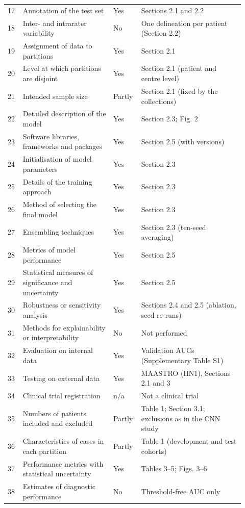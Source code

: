 \begin{longtable}{@{}L{0.06\linewidth}L{0.36\linewidth}L{0.08\linewidth}L{0.415\linewidth}@{}}
17 & Annotation of the test set & Yes & Sections 2.1 and 2.2 \\
18 & Inter- and intrarater variability & No & One delineation per patient (Section 2.2) \\
19 & Assignment of data to partitions & Yes & Section 2.1 \\
20 & Level at which partitions are disjoint & Yes & Section 2.1 (patient and centre level) \\
21 & Intended sample size & Partly & Section 2.1 (fixed by the collections) \\
22 & Detailed description of the model & Yes & Section 2.3; Fig. 2 \\
23 & Software libraries, frameworks and packages & Yes & Section 2.5 (with versions) \\
24 & Initialisation of model parameters & Yes & Section 2.3 \\
25 & Details of the training approach & Yes & Section 2.3 \\
26 & Method of selecting the final model & Yes & Section 2.3 \\
27 & Ensembling techniques & Yes & Section 2.3 (ten-seed averaging) \\
28 & Metrics of model performance & Yes & Section 2.5 \\
29 & Statistical measures of significance and uncertainty & Yes & Section 2.5 \\
30 & Robustness or sensitivity analysis & Yes & Sections 2.4 and 2.5 (ablation, seed re-runs) \\
31 & Methods for explainability or interpretability & No & Not performed \\
32 & Evaluation on internal data & Yes & Validation AUCs (Supplementary Table S1) \\
33 & Testing on external data & Yes & MAASTRO (HN1), Sections 2.1 and 3 \\
34 & Clinical trial registration & n/a & Not a clinical trial \\
35 & Numbers of patients included and excluded & Partly & Table 1; Section 3.1; exclusions as in the CNN study \\
36 & Characteristics of cases in each partition & Partly & Table 1 (development and test cohorts) \\
37 & Performance metrics with statistical uncertainty & Yes & Tables 3--5; Figs. 3--6 \\
38 & Estimates of diagnostic performance & No & Threshold-free AUC only \\

\end{longtable}
